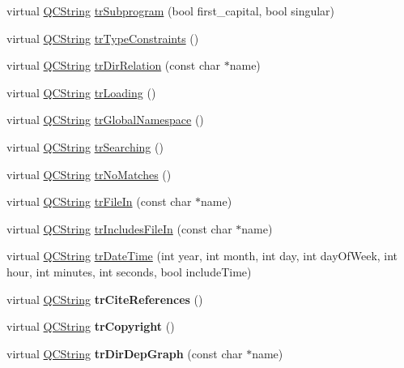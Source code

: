 \begin{DoxyCompactItemize}
\item 
virtual \mbox{\hyperlink{class_q_c_string}{Q\+C\+String}} \mbox{\hyperlink{class_translator_danish_a2506998cfc0654bed4d5575106697dd9}{tr\+Subprogram}} (bool first\+\_\+capital, bool singular)
\item 
virtual \mbox{\hyperlink{class_q_c_string}{Q\+C\+String}} \mbox{\hyperlink{class_translator_danish_a170dceaf0c66de4a6057aef089fe8102}{tr\+Type\+Constraints}} ()
\item 
virtual \mbox{\hyperlink{class_q_c_string}{Q\+C\+String}} \mbox{\hyperlink{class_translator_danish_af1ed1ccdc6ae2f20e8134db08d7c051e}{tr\+Dir\+Relation}} (const char $\ast$name)
\item 
virtual \mbox{\hyperlink{class_q_c_string}{Q\+C\+String}} \mbox{\hyperlink{class_translator_danish_a4146afb518e742269190704e3c8fc6ae}{tr\+Loading}} ()
\item 
virtual \mbox{\hyperlink{class_q_c_string}{Q\+C\+String}} \mbox{\hyperlink{class_translator_danish_ac29a78886ffbbe26155c998d6a15b82b}{tr\+Global\+Namespace}} ()
\item 
virtual \mbox{\hyperlink{class_q_c_string}{Q\+C\+String}} \mbox{\hyperlink{class_translator_danish_aab046ce1b4220094347ced6badfadb3b}{tr\+Searching}} ()
\item 
virtual \mbox{\hyperlink{class_q_c_string}{Q\+C\+String}} \mbox{\hyperlink{class_translator_danish_a94da6629b40041ddec9f763aef31ba44}{tr\+No\+Matches}} ()
\item 
virtual \mbox{\hyperlink{class_q_c_string}{Q\+C\+String}} \mbox{\hyperlink{class_translator_danish_a08d0121dfe4f7373b80e51fbd70bc995}{tr\+File\+In}} (const char $\ast$name)
\item 
virtual \mbox{\hyperlink{class_q_c_string}{Q\+C\+String}} \mbox{\hyperlink{class_translator_danish_a3d0c89fe22355600358dc15fec3bbf9a}{tr\+Includes\+File\+In}} (const char $\ast$name)
\item 
virtual \mbox{\hyperlink{class_q_c_string}{Q\+C\+String}} \mbox{\hyperlink{class_translator_danish_a6b1b8f959c432ab7959b2509d0195c1f}{tr\+Date\+Time}} (int year, int month, int day, int day\+Of\+Week, int hour, int minutes, int seconds, bool include\+Time)
\item 
\mbox{\label{class_translator_danish_a5dfbb408f0d3aea6af3b16dbc16974a3}} 
virtual \mbox{\hyperlink{class_q_c_string}{Q\+C\+String}} {\bfseries tr\+Cite\+References} ()
\item 
\mbox{\label{class_translator_danish_ac6e19d1f52eebb5f38cf72ef9fff123c}} 
virtual \mbox{\hyperlink{class_q_c_string}{Q\+C\+String}} {\bfseries tr\+Copyright} ()
\item 
\mbox{\label{class_translator_danish_ad55b27019403e6a5e8148a022259eb75}} 
virtual \mbox{\hyperlink{class_q_c_string}{Q\+C\+String}} {\bfseries tr\+Dir\+Dep\+Graph} (const char $\ast$name)
\end{DoxyCompactItemize}
